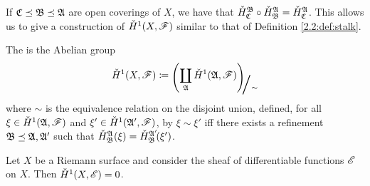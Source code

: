 \documentclass[../Moduli_Spaces_of_Riemann_Surfaces.tex]{subfiles}
\begin{document}
    \begin{remark}
        If $\mathfrak{C}\preceq\mathfrak{B}\preceq\mathfrak{A}$ are open coverings of $X$, we have that $\check{H}^{\mathfrak{B}}_{\mathfrak{C}}\circ\check{H}^{\mathfrak{A}}_{\mathfrak{B}}=\check{H}^{\mathfrak{A}}_{\mathfrak{C}}$. This allows us to give a construction of $\check{H}^1\!\left(X,\mathscr{F}\right)$ similar to that of Definition \ref{2.2:def:stalk}.\exqed
    \end{remark}
    \begin{definition}
        The  is the Abelian group
        \begin{equation*}
            \check{H}^1\!\l(X,\ms{F}\r)\coloneqq\raisebox{-2pt}{$\Biggl(\!$}\coprod_{\mf{A}}\check{H}^1\!\l(\mf{A},\ms{F}\r)\!\raisebox{-2pt}{$\Biggr)$}\!\!_{\scalebox{2}{/}\sim}
        \end{equation*}
        where $\sim$ is the equivalence relation on the disjoint union, defined, for all $\xi\in\check{H}^1\!\left(\mathfrak{A},\mathscr{F}\right)$ and $\xi'\in\check{H}^1\!\left(\mathfrak{A}',\mathscr{F}\right)$, by $\xi\sim\xi'$ iff there exists a refinement $\mathfrak{B}\preceq\mathfrak{A},\mathfrak{A}'$ such that $\check{H}^{\mathfrak{A}}_{\mathfrak{B}}\!\left(\xi\right)=\check{H}^{\mathfrak{A}'}_{\mathfrak{B}}\!\!\left(\xi'\right)$.
    \end{definition}
    \vspace{-0.05in}
    \begin{proposition}\label{prp:3.2:vanishing_of_sheaf_differentiable}
        Let $X$ be a Riemann surface and consider the sheaf of differentiable functions $\mathscr{E}$ on $X$. Then $\check{H}^1\!\left(X,\mathscr{E}\right)=0$.
    \end{proposition}
\end{document}
